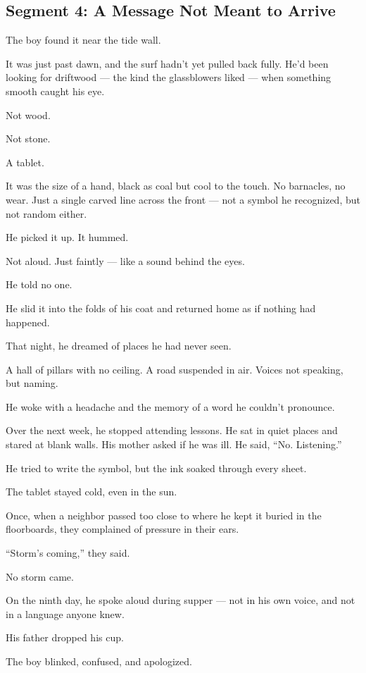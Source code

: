 \documentclass[9pt]{article}
\begin{document}
\subsection*{Segment 4: A Message Not Meant to Arrive}

The boy found it near the tide wall.

It was just past dawn, and the surf hadn’t yet pulled back fully. He’d been looking for driftwood — the kind the glassblowers liked — when something smooth caught his eye.

Not wood.

Not stone.

A tablet.

It was the size of a hand, black as coal but cool to the touch. No barnacles, no wear. Just a single carved line across the front — not a symbol he recognized, but not random either.

He picked it up. It hummed.

Not aloud. Just faintly — like a sound behind the eyes.

He told no one.

He slid it into the folds of his coat and returned home as if nothing had happened.

That night, he dreamed of places he had never seen.

A hall of pillars with no ceiling. A road suspended in air. Voices not speaking, but naming.

He woke with a headache and the memory of a word he couldn’t pronounce.

Over the next week, he stopped attending lessons. He sat in quiet places and stared at blank walls. His mother asked if he was ill. He said, ``No. Listening.''

He tried to write the symbol, but the ink soaked through every sheet.

The tablet stayed cold, even in the sun.

Once, when a neighbor passed too close to where he kept it buried in the floorboards, they complained of pressure in their ears.

``Storm’s coming,'' they said.

No storm came.

On the ninth day, he spoke aloud during supper — not in his own voice, and not in a language anyone knew.

His father dropped his cup.

The boy blinked, confused, and apologized.
\end{document}
